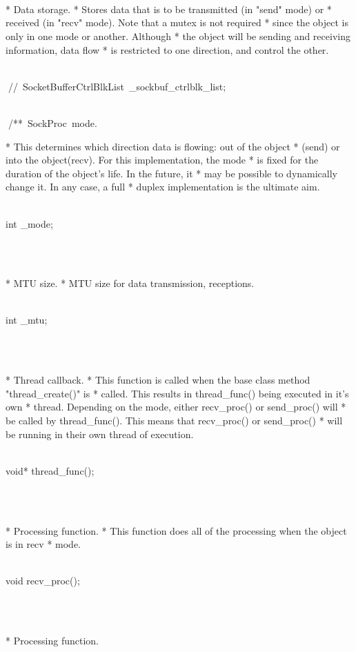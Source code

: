 \documentclass{article}
\begin{document}
 {
\strut\\\strut\\* Data storage.
	  * Stores data that is to be transmitted (in "send" mode) or 
	  * received (in "recv" mode). Note that a mutex is not required
	  * since the object is only in one mode or another. Although
	  * the object will be sending and receiving information, data flow
	  * is restricted to one direction, and control the other. 
	  \strut\goodbreak
{}\strut\nopagebreak\\
         
\hbox{// SocketBufferCtrlBlkList _sockbuf_ctrlblk_list;}\strut\\
         
\hbox{/** SockProc mode.}

	  * This determines which direction data is flowing: out of the object
	  * (send) or into the object(recv). For this implementation, the mode
	  * is fixed for the duration of the object's life. In the future, it
	  * may be possible to dynamically change it. In any case, a full
	  * duplex implementation is the ultimate aim.
	  \strut\goodbreak
{}\strut\nopagebreak\\
         int _mode;
\strut\\\strut\\* MTU size.
	  * MTU size for data transmission, receptions.
	  \strut\goodbreak
{}\strut\nopagebreak\\
         int _mtu;
\strut\\\strut\\* Thread callback.
	  * This function is called when the base class method "thread_create()" is
	  * called. This results in thread_func() being executed in it's own
	  * thread. Depending on the mode, either recv_proc() or send_proc() will
	  * be called by thread_func(). This means that recv_proc() or send_proc()
	  * will be running in their own thread of execution.
	  \strut\goodbreak
{}\strut\nopagebreak\\
         void* thread_func();
\strut\\\strut\\* Processing function.
	  * This function does all of the processing when the object is in recv
	  * mode.
	  \strut\goodbreak
{}\strut\nopagebreak\\
         void recv_proc();
\strut\\\strut\\* Processing function.
}
\end{document}
